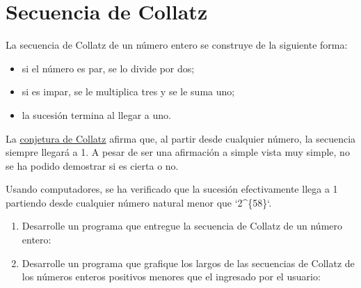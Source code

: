 \section{Secuencia de Collatz}

La secuencia de Collatz de un número entero se construye de la siguiente
forma:

\begin{itemize}
\item
  si el número es par, se lo divide por dos;
\item
  si es impar, se le multiplica tres y se le suma uno;
\item
  la sucesión termina al llegar a uno.
\end{itemize}

La \href{http://es.wikipedia.org/wiki/Conjetura\_de\_Collatz}{conjetura
de Collatz} afirma que, al partir desde cualquier número, la secuencia
siempre llegará a 1. A pesar de ser una afirmación a simple vista muy
simple, no se ha podido demostrar si es cierta o no.

Usando computadores, se ha verificado que la sucesión efectivamente
llega a 1 partiendo desde cualquier número natural menor que
`2\^{}\{58\}`.

\begin{enumerate}
\item
  Desarrolle un programa que entregue la secuencia de Collatz de un
  número entero:
\item
  Desarrolle un programa que grafique los largos de las secuencias de
  Collatz de los números enteros positivos menores que el ingresado por
  el usuario:
\end{enumerate}
